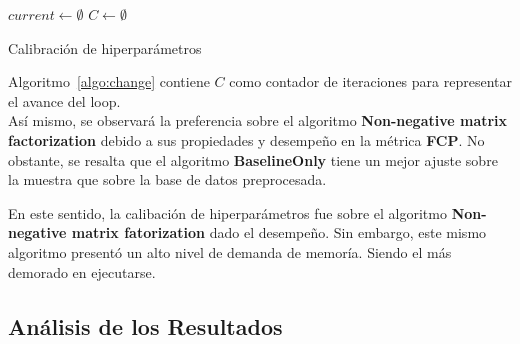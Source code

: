 \documentclass{article}
\begin{document}
\begin{algorithm}[H]
\SetAlgoLined
 $current \gets \emptyset$\;
 $C \gets \emptyset$\;
\;
\caption{Calibración de hiperparámetros}
\label{algo:change}
\end{algorithm}

Algoritmo~\ref{algo:change} contiene $C$ como contador de iteraciones para representar el avance del loop.\\


Así mismo, se observará la preferencia sobre el algoritmo \textbf{Non-negative matrix factorization} debido a sus propiedades y desempeño en la métrica \textbf{ FCP}. No obstante, se resalta que el algoritmo \textbf{BaselineOnly} tiene un mejor ajuste sobre la muestra que sobre la base de datos preprocesada.

En este sentido, la calibación de hiperparámetros fue sobre el algoritmo \textbf{Non-negative matrix fatorization} dado el desempeño. Sin embargo, este mismo algoritmo presentó un alto nivel de demanda de memoría. Siendo el más demorado en ejecutarse.

\subsection{Análisis de los Resultados}


\end{document}
